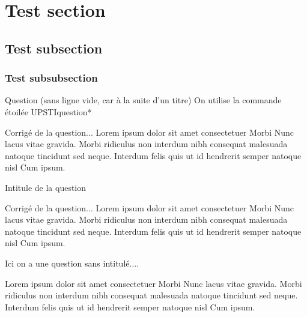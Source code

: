 \documentclass[11pt]{article}
\begin{document}
\UPSTIpreambuleEpreuve	%



\section{Test section}

\subsection{Test subsection}


\subsubsection{Test subsubsection}

\UPSTIquestion* Question (sans ligne vide, car à la suite d'un titre) On utilise la commande étoilée UPSTIquestion*

\begin{UPSTIcorrige}
Corrigé de la question... Lorem ipsum dolor sit amet consectetuer Morbi Nunc lacus vitae gravida. Morbi ridiculus non interdum nibh consequat malesuada natoque tincidunt sed neque. Interdum felis quis ut id hendrerit semper natoque nisl Cum ipsum. 
\end{UPSTIcorrige}


\UPSTIquestion Intitule de la question

\begin{UPSTIcorrige}
Corrigé de la question... Lorem ipsum dolor sit amet consectetuer Morbi Nunc lacus vitae gravida. Morbi ridiculus non interdum nibh consequat malesuada natoque tincidunt sed neque. Interdum felis quis ut id hendrerit semper natoque nisl Cum ipsum.
\end{UPSTIcorrige}

\UPSTIquestion

\begin{UPSTIcorrige}
Ici on a une question sans intitulé....

Lorem ipsum dolor sit amet consectetuer Morbi Nunc lacus vitae gravida. Morbi ridiculus non interdum nibh consequat malesuada natoque tincidunt sed neque. Interdum felis quis ut id hendrerit semper natoque nisl Cum ipsum. 
\end{UPSTIcorrige}

\end{document}
